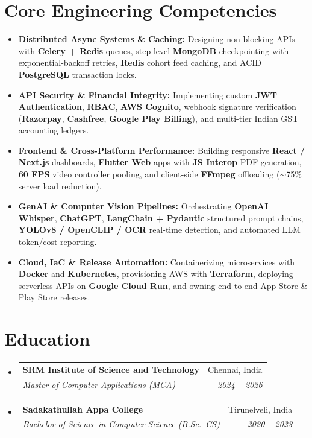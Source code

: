 \documentclass[letterpaper,10pt]{article}
\makeatletter
\newcommand{\resumeItem}[1]{
  \item\small{
    {#1 \vspace{-1pt}}
  }
}
\newcommand{\resumeSubheading}[4]{
  \vspace{-2pt}\item
    \begin{tabular*}{1.0\textwidth}[t]{l@{\extracolsep{\fill}}r}
      \textbf{#1} & #2 \\
      \textit{\small#3} & \textit{\small #4} \\
    \end{tabular*}\vspace{-6pt}
}
\newcommand{\resumeSubHeadingListStart}{\begin{itemize}[leftmargin=0.0in, label={}]}
\newcommand{\resumeSubHeadingListEnd}{\end{itemize}}
\makeatother
\begin{document}
\section{Core Engineering Competencies}
  \begin{itemize}[leftmargin=0.16in, itemsep=2.5pt, parsep=0pt, topsep=3pt]
    \resumeItem{\textbf{Distributed Async Systems \& Caching:} Designing non-blocking APIs with \textbf{Celery + Redis} queues, step-level \textbf{MongoDB} checkpointing with exponential-backoff retries, \textbf{Redis} cohort feed caching, and ACID \textbf{PostgreSQL} transaction locks.}
    \resumeItem{\textbf{API Security \& Financial Integrity:} Implementing custom \textbf{JWT Authentication}, \textbf{RBAC}, \textbf{AWS Cognito}, webhook signature verification (\textbf{Razorpay}, \textbf{Cashfree}, \textbf{Google Play Billing}), and multi-tier Indian GST accounting ledgers.}
    \resumeItem{\textbf{Frontend \& Cross-Platform Performance:} Building responsive \textbf{React / Next.js} dashboards, \textbf{Flutter Web} apps with \textbf{JS Interop} PDF generation, \textbf{60 FPS} video controller pooling, and client-side \textbf{FFmpeg} offloading ($\sim$75\% server load reduction).}
    \resumeItem{\textbf{GenAI \& Computer Vision Pipelines:} Orchestrating \textbf{OpenAI Whisper}, \textbf{ChatGPT}, \textbf{LangChain + Pydantic} structured prompt chains, \textbf{YOLOv8 / OpenCLIP / OCR} real-time detection, and automated LLM token/cost reporting.}
    \resumeItem{\textbf{Cloud, IaC \& Release Automation:} Containerizing microservices with \textbf{Docker} and \textbf{Kubernetes}, provisioning AWS with \textbf{Terraform}, deploying serverless APIs on \textbf{Google Cloud Run}, and owning end-to-end App Store \& Play Store releases.}
  \end{itemize}
  \vspace{2pt}

\section{Education}
  \resumeSubHeadingListStart
    \resumeSubheading
      {SRM Institute of Science and Technology}{Chennai, India}
      {Master of Computer Applications (MCA)}{2024 -- 2026}
    \resumeSubheading
      {Sadakathullah Appa College}{Tirunelveli, India}
      {Bachelor of Science in Computer Science (B.Sc.\ CS)}{2020 -- 2023}
  \resumeSubHeadingListEnd

\end{document}
